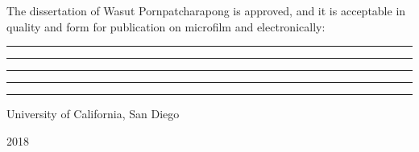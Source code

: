 \newpage
\thispagestyle{plain}

\doublespacing

\vspace*{\fill}

\noindent The dissertation of Wasut Pornpatcharapong is approved, and it is acceptable in quality and form
for publication on microfilm and electronically:

\vspace{0.35cm}

\par\noindent\rule{\textwidth}{0.5pt}

\vspace{0.35cm}

\par\noindent\rule{\textwidth}{0.5pt}

\vspace{0.35cm}

\par\noindent\rule{\textwidth}{0.5pt}

\vspace{0.35cm}

\par\noindent\rule{\textwidth}{0.5pt}

\vspace{0.35cm}

\par\noindent\rule{\textwidth}{0.5pt}


\begin{center}
    University of California, San Diego
 
    2018
\end{center}

\vspace*{\fill}
